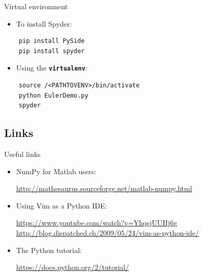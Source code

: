 \documentclass[xcolor=x11names, compress]{beamer}
\renewcommand{\(}{\begin{columns}}
\renewcommand{\)}{\end{columns}}
\newcommand{\<}[1]{\begin{column}{#1}}
\renewcommand{\>}{\end{column}}
\newcommand{\ver}[1]{\texttt{\textbf{#1}}}
\begin{document}
\begin{frame}[fragile]{Virtual environment}

  \begin{itemize}
    \item To install Spyder:
  \end{itemize}
  \begin{verbatim}
    pip install PySide
    pip install spyder
  \end{verbatim}

  \vspace{10pt}

  \begin{itemize}
    \item Using the \ver{virtualenv}:
  \end{itemize}
  \begin{verbatim}
    source /<PATHTOVENV>/bin/activate
    python EulerDemo.py
    spyder
  \end{verbatim}
  
\end{frame}

\subsection{Links}
\begin{frame}{Useful links}

  \large

  \begin{itemize}
    \item NumPy for Matlab users:

    \vspace{5pt}
    {\scriptsize \centering \url{http://mathesaurus.sourceforge.net/matlab-numpy.html}\\}

    \vspace{8pt}
    \item Using Vim as a Python IDE:

    \vspace{5pt}
    {\scriptsize \centering \url{https://www.youtube.com/watch?v=YhqsjUUHj6g} \\
    \url{http://blog.dispatched.ch/2009/05/24/vim-as-python-ide/}}

    \vspace{8pt}
    \item The Python tutorial:

    \vspace{5pt}
    {\scriptsize \centering \url{https://docs.python.org/2/tutorial/}\\}

  \end{itemize}


\end{frame}
\end{document}
